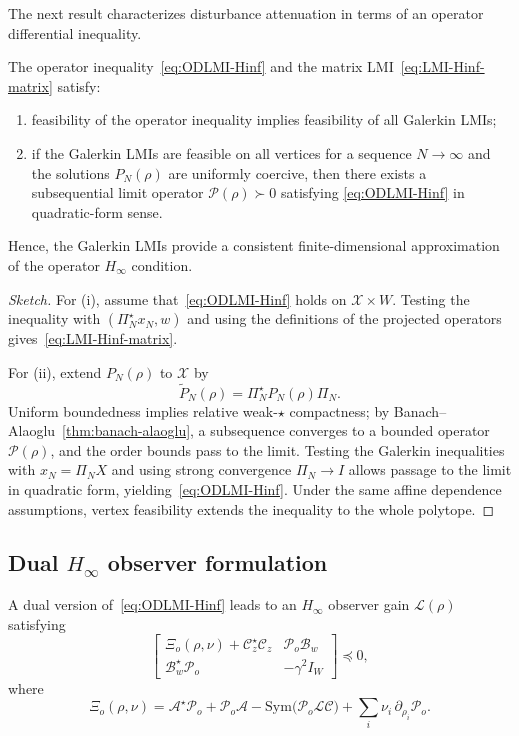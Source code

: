 \documentclass[AMA,Times2COL]{WileyNJDv5}
\newcommand{\preceqop}{\mathrel{\preccurlyeq}}
\begin{document}
The next result characterizes disturbance attenuation in terms of an operator differential inequality.

\begin{proposition}
\label{prop:consistency-Hinf}
The operator inequality~\eqref{eq:ODLMI-Hinf} and the matrix LMI~\eqref{eq:LMI-Hinf-matrix} satisfy:
\begin{enumerate}
\item[(i)] feasibility of the operator inequality implies feasibility of all Galerkin LMIs;
\item[(ii)] if the Galerkin LMIs are feasible on all vertices for a sequence $N\to\infty$ and the solutions $P_N(\rho)$ are uniformly coercive, then there
exists a subsequential limit operator $\mathcal{P}(\rho)\succ0$ satisfying
\eqref{eq:ODLMI-Hinf} in quadratic-form sense.
\end{enumerate}
Hence, the Galerkin LMIs provide a consistent finite-dimensional approximation of the operator $H_\infty$ condition.
\end{proposition}

\begin{proof}[Sketch]
For (i), assume that~\eqref{eq:ODLMI-Hinf} holds on
$\mathscr X\times W$. Testing the inequality with
$(\Pi_N^\star x_N,w)$ and using the definitions of the projected operators gives~\eqref{eq:LMI-Hinf-matrix}.

For (ii), extend $P_N(\rho)$ to $\mathscr X$ by
\[
\widetilde P_N(\rho)=\Pi_N^\star P_N(\rho)\Pi_N .
\]
Uniform boundedness implies relative weak-$\star$ compactness; by Banach--Alaoglu~\ref{thm:banach-alaoglu}, a subsequence converges to a bounded
operator $\mathcal P(\rho)$, and the order bounds pass to the limit. Testing the Galerkin inequalities with $x_N=\Pi_NX$ and using strong convergence
$\Pi_N\to I$ allows passage to the limit in quadratic form, yielding~\eqref{eq:ODLMI-Hinf}. Under the same affine dependence assumptions, vertex feasibility extends the inequality to the whole polytope.
\end{proof}

\subsection{Dual \texorpdfstring{$H_\infty$}{H-infinity} observer formulation}

A dual version of~\eqref{eq:ODLMI-Hinf} leads to an $H_\infty$ observer gain $\mathcal{L}(\rho)$ satisfying
\begin{equation}\label{eq:Hinf-dual}
\begin{bmatrix}
\Xi_o(\rho,\nu)+\mathcal{C}_z^{\star}\mathcal{C}_z
&
\mathcal{P}_o\mathcal{B}_w
\\[0.3em]
\mathcal{B}_w^{\star}\mathcal{P}_o
&
-\gamma^{2}I_W
\end{bmatrix}
\preceqop 0,
\end{equation}
where
\[
\Xi_o(\rho,\nu)
=
\mathcal{A}^{\star}\mathcal{P}_o
+
\mathcal{P}_o\mathcal{A}
-
\mathrm{Sym}\big(\mathcal{P}_o \mathcal{L}\mathcal{C}\big)
+
\sum_i \nu_i\,\partial_{\rho_i}\mathcal{P}_o .
\]
\end{document}
